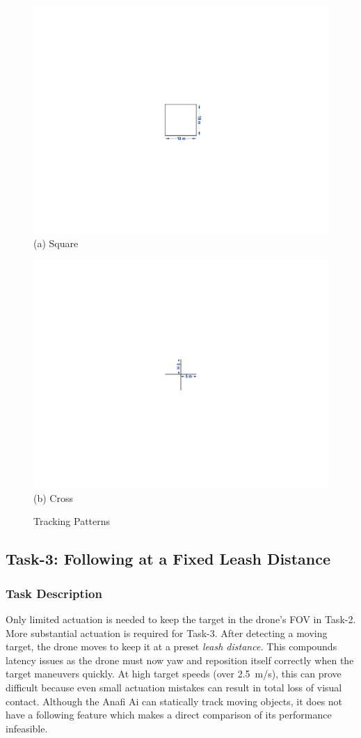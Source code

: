 \begin{figure}
\begin{minipage}{0.5\linewidth}
\centering
\includegraphics[width=0.6\linewidth]{chapter4/FIGS/fig-pattern-square.pdf}\\
{(a) Square}\\
\end{minipage}
\begin{minipage}{0.5\linewidth}
\centering
\includegraphics[width=0.6\linewidth]{chapter4/FIGS/fig-pattern-cross.pdf}\\
{(b) Cross}\\
\end{minipage}
\caption{Tracking Patterns}
\label{fig:patterns}
\end{figure}

\subsection{Task-3: Following at a Fixed Leash Distance}
\label{sec:task3}

\subsubsection{Task Description}
\label{sec:task3-desc}

Only limited actuation is needed to keep the target in the
drone's FOV in Task-2.  More substantial actuation is required for
Task-3.  After detecting a moving target, the drone moves to keep it
at a preset {\em leash distance.} This compounds latency issues as the
drone must now yaw and reposition itself correctly when the target
maneuvers quickly. At high target speeds (over 2.5~m/s), this can
prove difficult because even small actuation mistakes can result in
total loss of visual contact. Although the Anafi Ai can statically
track moving objects, it does not have a 
following feature which makes a direct comparison of its performance infeasible.

